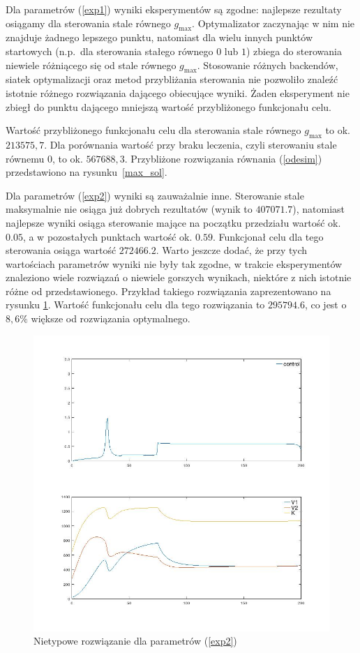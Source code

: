 \documentclass[11pt]{article}
\begin{document}
Dla parametrów (\ref{exp1}) wyniki eksperymentów są zgodne: najlepsze rezultaty osiągamy dla sterowania stale równego $g_{\max}$. Optymalizator zaczynając w nim nie znajduje żadnego lepszego punktu, natomiast dla wielu innych punktów startowych (n.p.\ dla sterowania stałego równego $0$ lub $1$) zbiega do sterowania niewiele różniącego się od stale równego $g_{\max}$. Stosowanie różnych backendów, siatek optymalizacji oraz metod przybliżania sterowania nie pozwoliło znaleźć istotnie różnego rozwiązania dającego obiecujące wyniki. Żaden eksperyment nie zbiegł do punktu dającego mniejszą wartość przybliżonego funkcjonału celu.

Wartość przybliżonego funkcjonału celu dla sterowania stale równego $g_{\max}$ to ok. $213575,7$. Dla porównania wartość przy braku leczenia, czyli sterowaniu stale równemu $0$, to ok. $567688,3$. Przybliżone rozwiązania równania (\ref{odesim}) przedstawiono na rysunku~\ref{max_sol}.

Dla parametrów (\ref{exp2}) wyniki są zauważalnie inne. Sterowanie stale maksymalnie nie osiąga już dobrych rezultatów (wynik to $407071.7$), natomiast najlepsze wyniki osiąga sterowanie mające na początku przedziału wartość ok. $0.05$, a w pozostałych punktach wartość ok. $0.59$. Funkcjonał celu dla tego sterowania osiąga wartość $272466.2$. Warto jeszcze dodać, że przy tych wartościach parametrów wyniki nie były tak zgodne, w trakcie eksperymentów znaleziono wiele rozwiązań o niewiele gorszych wynikach, niektóre z nich istotnie różne od przedstawionego. Przykład takiego rozwiązania zaprezentowano na rysunku \ref{weird_sol}. Wartość funkcjonału celu dla tego rozwiązania to $295794.6$, co jest o $8,6\%$ większe od rozwiązania optymalnego.

\begin{figure}[h]
  \centering
  \caption{Nietypowe rozwiązanie dla parametrów (\ref{exp2})}\label{weird_sol}
  \includegraphics[width=.5\textwidth]{plot_weird}
\end{figure}
\end{document}
